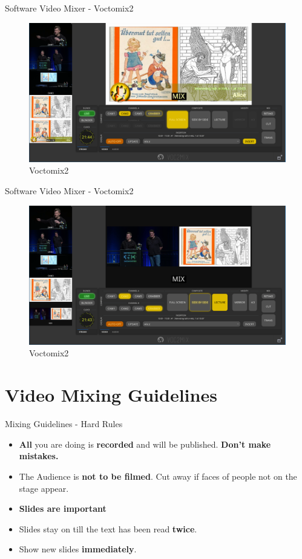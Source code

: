 \documentclass[aspectratio=169]{beamer}
\begin{document}
\begin{frame}{Software Video Mixer - Voctomix2}
	\begin{figure} 
		\centering
		\includegraphics[width=.9\textwidth]{images/voctomix2_2.png}
		\caption{Voctomix2}
	\end{figure}
\end{frame}

\begin{frame}{Software Video Mixer - Voctomix2}
	\begin{figure} 
		\centering
		\includegraphics[width=.9\textwidth]{images/voctomix2_3.png}
		\caption{Voctomix2}
	\end{figure}
\end{frame}




\section{Video Mixing Guidelines}
\begin{frame}{Mixing Guidelines - Hard Rules}
	\begin{itemize}
		\item \textbf{All} you are doing is \textbf{recorded} and will be published. \alert{\textbf{Don't make mistakes.}}
		\item The Audience is \textbf{not to be filmed}. Cut away if faces of people not on the stage appear.
		\item \textbf{Slides are important}
		\item Slides stay on till the text has been read \textbf{twice}.
		\item Show new slides \textbf{immediately}.
	\end{itemize}

\end{frame}
\end{document}
